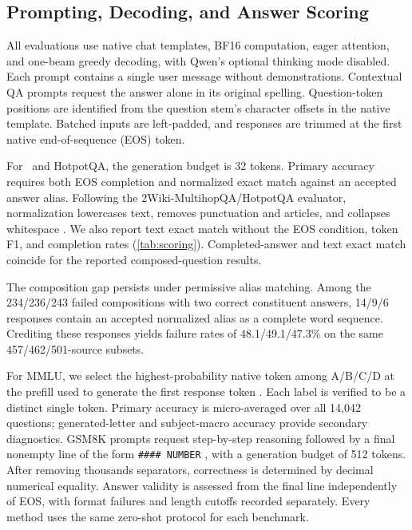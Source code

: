 \subsection{Prompting, Decoding, and Answer Scoring}
\label{app:scoring_protocol}

All evaluations use native chat templates, BF16 computation, eager attention, and one-beam greedy decoding, with Qwen's optional thinking mode disabled. Each prompt contains a single user message without demonstrations. Contextual QA prompts request the answer alone in its original spelling. Question-token positions are identified from the question stem's character offsets in the native template. Batched inputs are left-padded, and responses are trimmed at the first native end-of-sequence (EOS) token.

For \dataset\ and HotpotQA, the generation budget is 32 tokens. Primary accuracy requires both EOS completion and normalized exact match against an accepted answer alias. Following the 2Wiki-MultihopQA/HotpotQA evaluator, normalization lowercases text, removes punctuation and articles, and collapses whitespace \citep{ho2020constructing,yang2018hotpotqa,alab2020twikievaluation}. We also report text exact match without the EOS condition, token F1, and completion rates (\cref{tab:scoring}). Completed-answer and text exact match coincide for the reported composed-question results.

The composition gap persists under permissive alias matching. Among the 234/236/243 failed compositions with two correct constituent answers, 14/9/6 responses contain an accepted normalized alias as a complete word sequence. Crediting these responses yields failure rates of 48.1/49.1/47.3\% on the same 457/462/501-source subsets.

For MMLU, we select the highest-probability native token among A/B/C/D at the prefill used to generate the first response token \citep{hendrycks2021mmlu}. Each label is verified to be a distinct single token. Primary accuracy is micro-averaged over all 14,042 questions; generated-letter and subject-macro accuracy provide secondary diagnostics. GSM8K prompts request step-by-step reasoning followed by a final nonempty line of the form \texttt{\#\#\#\# NUMBER} \citep{cobbe2021gsm8k}, with a generation budget of 512 tokens. After removing thousands separators, correctness is determined by decimal numerical equality. Answer validity is assessed from the final line independently of EOS, with format failures and length cutoffs recorded separately. Every method uses the same zero-shot protocol for each benchmark.

